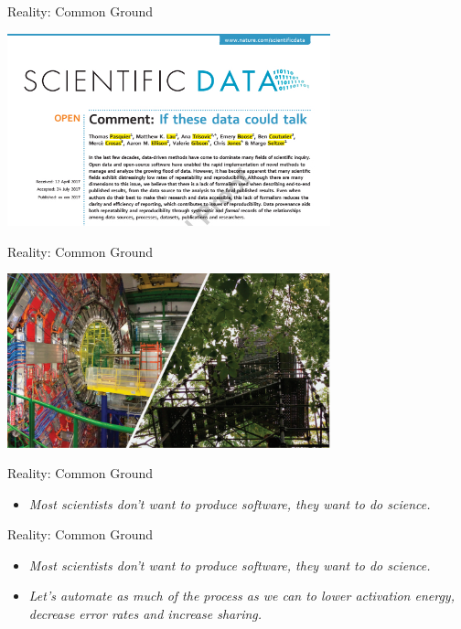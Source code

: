 \documentclass[ignorenonframetext,]{beamer}
\providecommand{\tightlist}{%
  \setlength{\itemsep}{0pt}\setlength{\parskip}{0pt}}
\begin{document}
\begin{frame}{Reality: Common Ground}
\protect\hypertarget{reality-common-ground}{}

\includegraphics[width=0.7\textwidth,height=\textheight]{nsd.png}

\end{frame}

\begin{frame}{Reality: Common Ground}
\protect\hypertarget{reality-common-ground-1}{}

\includegraphics[width=0.7\textwidth,height=\textheight]{cern_hf.png}

\end{frame}

\begin{frame}{Reality: Common Ground}
\protect\hypertarget{reality-common-ground-2}{}

\begin{itemize}
\tightlist
\item
  \emph{Most scientists don't want to produce software, they want to do
  science.}
\end{itemize}

\end{frame}

\begin{frame}{Reality: Common Ground}
\protect\hypertarget{reality-common-ground-3}{}

\begin{itemize}
\item
  \emph{Most scientists don't want to produce software, they want to do
  science.}
\item
  \emph{Let's automate as much of the process as we can to lower
  activation energy, decrease error rates and increase sharing.}
\end{itemize}

\end{frame}
\end{document}
